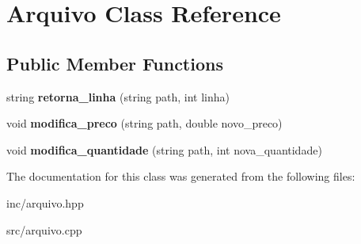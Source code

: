 \hypertarget{class_arquivo}{}\section{Arquivo Class Reference}
\label{class_arquivo}
\subsection*{Public Member Functions}
\begin{DoxyCompactItemize}
\item 
\mbox{\label{class_arquivo_a85d0577393ab9d2293ca837fe3c0d11a}} 
string {\bfseries retorna\+\_\+linha} (string path, int linha)
\item 
\mbox{\label{class_arquivo_a3a57b58a5ae3609ead87eef74c84cab2}} 
void {\bfseries modifica\+\_\+preco} (string path, double novo\+\_\+preco)
\item 
\mbox{\label{class_arquivo_a13175f4b22c398c3982a073dece8b2a7}} 
void {\bfseries modifica\+\_\+quantidade} (string path, int nova\+\_\+quantidade)
\end{DoxyCompactItemize}


The documentation for this class was generated from the following files\+:\begin{DoxyCompactItemize}
\item 
inc/arquivo.\+hpp\item 
src/arquivo.\+cpp\end{DoxyCompactItemize}
